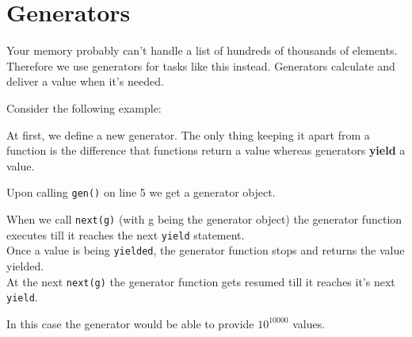 \section{Generators}
    Your memory probably can't handle a list of hundreds of thousands of elements.
    Therefore we use generators for tasks like this instead.
    Generators calculate and deliver a value when it's needed.
    
    Consider the following example:

    
    At first, we define a new generator.
    The only thing keeping it apart from a function is the difference that functions return a value whereas generators \textbf{yield} a value.
    
    Upon calling \texttt{gen()} on line 5 we get a generator object.
    
    When we call \texttt{next(g)} (with g being the generator object) the generator function executes till it reaches the next \texttt{yield} statement.\\
    Once a value is being \texttt{yielded}, the generator function stops and returns the value yielded.\\
    At the next \texttt{next(g)} the generator function gets resumed till it reaches it's next \texttt{yield}.
    
    In this case the generator would be able to provide \( 10^{10000} \) values.
    
    